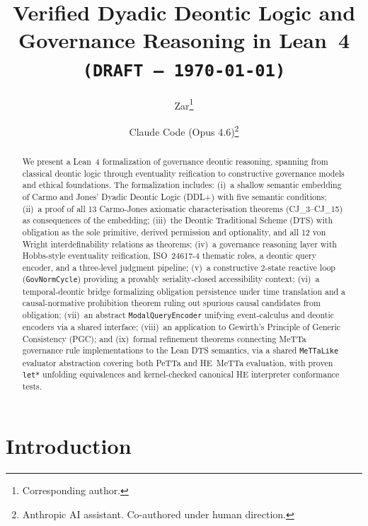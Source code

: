 \documentclass[]{article}
\title{Verified Dyadic Deontic Logic and Governance Reasoning in Lean~4\\
  \texttt{(DRAFT --- \today)}}
\author{Zar\footnote{Corresponding author.}
\and Claude Code (Opus 4.6)\footnote{Anthropic AI assistant. Co-authored under human direction.}}
\newcommand{\code}[1]{\texttt{#1}}
\newcommand{\DDL}{\textup{DDL+}}
\newcommand{\DTS}{\textup{DTS}}
\newcommand{\PGC}{\textup{PGC}}
\begin{document}
\maketitle

\begin{abstract}
We present a Lean~4 formalization of governance deontic reasoning,
spanning from classical deontic logic through eventuality reification to
constructive governance models and ethical foundations.
The formalization includes:
(i)~a shallow semantic embedding of Carmo and Jones' Dyadic Deontic Logic (\DDL{})
with five semantic conditions;
(ii)~a proof of all 13 Carmo-Jones axiomatic characterisation theorems (CJ\_3--CJ\_15)
as consequences of the embedding;
(iii)~the Deontic Traditional Scheme (\DTS{}) with obligation as the sole primitive,
derived permission and optionality, and all 12 von Wright interdefinability relations
as theorems;
(iv)~a governance reasoning layer with Hobbs-style eventuality reification, ISO~24617-4
thematic roles, a deontic query encoder, and a three-level judgment pipeline;
(v)~a constructive 2-state reactive loop (\code{GovNormCycle}) providing a provably
seriality-closed accessibility context;
(vi)~a temporal-deontic bridge formalizing obligation persistence under time translation
and a causal-normative prohibition theorem ruling out spurious causal candidates from
obligation;
(vii)~an abstract \code{ModalQueryEncoder} unifying event-calculus and deontic encoders
via a shared interface;
(viii)~an application to Gewirth's Principle of Generic
Consistency (\PGC{}); and
(ix)~formal refinement theorems connecting MeTTa governance rule implementations
to the Lean \DTS{} semantics, via a shared \code{MeTTaLike} evaluator abstraction
covering both PeTTa and HE~MeTTa evaluation, with proven \code{let*} unfolding
equivalences and kernel-checked canonical HE interpreter conformance tests.
\end{abstract}

\tableofcontents
\newpage

\section{Introduction}
\label{sec:intro}
\end{document}
